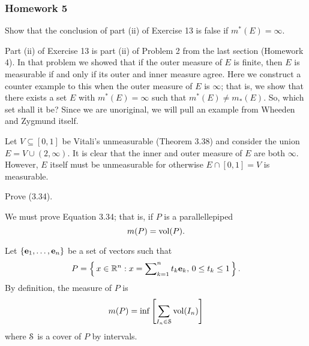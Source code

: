 \subsubsection{Homework 5}
\setcounter{exercise}{0}
\setcounter{equation}{0}

\begin{problem}
  Show that the conclusion of part (ii) of Exercise 13 is false if
  $m^*(E)=\infty$.
\end{problem}
\begin{solution}
  Part (ii) of Exercise 13 is part (ii) of Problem 2 from the last section
  (Homework 4). In that problem we showed that if the outer measure of $E$
  is finite, then $E$ is measurable if and only if its outer and inner
  measure agree. Here we construct a counter example to this when the outer
  measure of $E$ is $\infty$; that is, we show that there exists a set $E$
  with $m^*(E)=\infty$ such that $m^*(E)\neq m_*(E)$. So, which set shall
  it be? Since we are unoriginal, we will pull an example from Wheeden and
  Zygmund itself.

  Let $V\subseteq[0,1]$ be Vitali's unmeasurable (Theorem 3.38) and consider
  the union $E=V\cup(2,\infty)$. It is clear that the inner and outer
  measure of $E$ are both $\infty$. However, $E$ itself must be
  unmeasurable for otherwise $E\cap [0,1]=V$ is measurable.
\end{solution}

\begin{problem}
  Prove (3.34).
\end{problem}
\begin{solution}
  We must prove Equation 3.34; that is, if $P$ is a parallellepiped
  \[
    m(P)=\operatorname{vol}(P).
  \]

  Let $\{\mathbf{e}_1,\ldots,\mathbf{e}_n\}$ be a set of vectors such that
  \[
    P=\left\{\,x\in\mathbb{R}^n:
      \text{$x=\sum\nolimits_{k=1}^n t_k\mathbf{e}_k$, $0\leq t_k\leq 1$}\,\right\}.
  \]
  By definition, the measure of $P$ is
  \[
    m(P)=\inf\left[\sum_{I_n\in\mathcal{S}}\operatorname{vol}(I_n)\right]
  \]
  where $\mathcal{S}$ is a cover of $P$ by intervals.
\end{solution}

